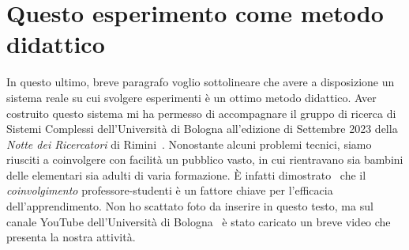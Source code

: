 \section{Questo esperimento come metodo didattico}
In questo ultimo, breve paragrafo voglio sottolineare che avere a disposizione
un sistema reale su cui svolgere esperimenti è un ottimo metodo didattico.
Aver costruito questo sistema mi ha permesso di
accompagnare il gruppo di ricerca di Sistemi Complessi dell'Università di Bologna
all'edizione di Settembre 2023 della \emph{Notte dei Ricercatori} di Rimini~\cite{notteRicercator}.
Nonostante alcuni problemi tecnici\footnotemark, siamo riusciti a coinvolgere con facilità un pubblico
vasto, in cui rientravano sia bambini delle elementari sia adulti di
varia formazione.
È infatti dimostrato~\cite{Hake_1998} che il \emph{coinvolgimento} professore-studenti
è un fattore chiave per l'efficacia dell'apprendimento.
Non ho scattato foto da inserire in questo testo,
ma sul canale YouTube dell'Università di Bologna~\cite{youtube} è stato caricato un breve
video che presenta la nostra attività.

